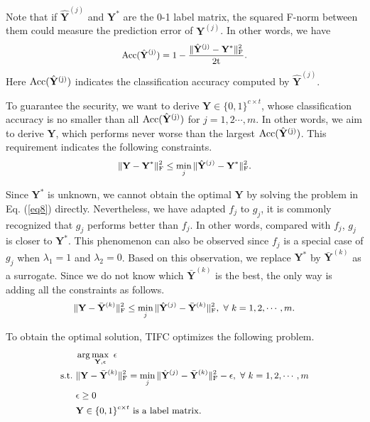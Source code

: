 \documentclass[10pt,journal,compsoc]{IEEEtran}
\begin{document}
Note that if $\hat{\mathbf{Y}}^{(j)}$ and $\mathbf{Y}^{*}$ are the 0-1 label matrix, the squared F-norm between them could measure the prediction error of $\mathbf{Y}^{(j)}$. In other words, we have
\begin{equation}
\label{eq7}
\small{
\begin{split}
\rm{Acc}(\hat{\mathbf{Y}}^{(j)}) = 1 - \frac{\|\hat{\mathbf{Y}}^{(j)}- \mathbf{Y}^{*}\|_{\rm{F}}^2}{2t}.
\end{split}}
\end{equation}
Here $\rm{Acc}(\hat{\mathbf{Y}}^{(j)})$ indicates the classification accuracy computed by $\hat{\mathbf{Y}}^{(j)}$.

To guarantee the security, we want to derive $\mathbf{Y} \in \{0,1\}^{c \times t}$, whose classification accuracy is no smaller than all $\rm{Acc}(\hat{\mathbf{Y}}^{(j)})$ for $j=1,2\cdots,m$. In other words, we aim to derive $\mathbf{Y}$, which performs never worse than the largest $\rm{Acc}(\hat{\mathbf{Y}}^{(j)})$. This requirement indicates the following constraints.
\begin{equation}
\label{eq8}
\small{
\begin{split}
\|\mathbf{Y}- \mathbf{Y}^{*}\|_{\rm{F}}^2 \leq \min_j \|\hat{\mathbf{Y}}^{(j)}- \mathbf{Y}^{*}\|_{\rm{F}}^2.
\end{split}}
\end{equation}

Since $\mathbf{Y}^{*}$ is unknown, we cannot obtain the optimal $\mathbf{Y}$ by solving the problem in Eq. (\ref{eq8}) directly. Nevertheless, we have adapted $f_j$ to $g_j$, it is commonly recognized that $g_j$ performs better than $f_j$. In other words, compared with $f_j$, $g_j$ is closer to $\mathbf{Y}^{*}$. This phenomenon can also be observed since $f_j$ is a special case of $g_j$ when $\lambda_1=1$ and $\lambda_2=0$. Based on this observation, we replace $\mathbf{Y}^{*}$ by $\bar{\mathbf{Y}}^{(k)}$ as a surrogate. Since we do not know which $\bar{\mathbf{Y}}^{(k)}$ is the best, the only way is adding all the constraints as follows.
\begin{equation}
\label{eq9}
\small{
\begin{split}
\|\mathbf{Y}- \bar{\mathbf{Y}}^{(k)}\|_{\rm{F}}^2 \leq \min_j \|\hat{\mathbf{Y}}^{(j)}- \bar{\mathbf{Y}}^{(k)}\|_{\rm{F}}^2, ~\forall~k=1,2,\cdots,m.
\end{split}}
\end{equation}

To obtain the optimal solution, TIFC optimizes the following problem.
\begin{equation}
\label{eq10}
\small{
\begin{split}
          & \arg\max_{\mathbf{Y}, \epsilon}~\epsilon\\
\rm{s.t.~} &\|\mathbf{Y}- \bar{\mathbf{Y}}^{(k)}\|_{\rm{F}}^2 = \min_j \|\hat{\mathbf{Y}}^{(j)}- \bar{\mathbf{Y}}^{(k)}\|_{\rm{F}}^2-\epsilon, ~\forall~k=1,2,\cdots, m\\
          & \epsilon \geq 0 \\
          & \mathbf{Y} \in \{0,1\}^{c \times t} \rm{~is~a~label~matrix.}
\end{split}}
\end{equation}
\end{document}
